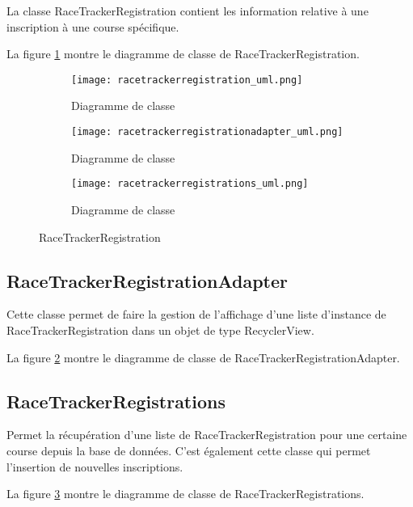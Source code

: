 La classe RaceTrackerRegistration contient les information relative à une inscription à une course spécifique.

La figure \ref{fig:racetrackerregistration_uml} montre le diagramme de classe de RaceTrackerRegistration.

\begin{figure}[htb!]
    \centering
    \begin{subfigure}[htb]{1\textwidth}
		\texttt{[image: racetrackerregistration\_uml.png]} 
		\caption{Diagramme de classe}
		\label{fig:racetrackerregistration_uml}
    \end{subfigure}
    \begin{subfigure}[htb]{1\textwidth}
		\texttt{[image: racetrackerregistrationadapter\_uml.png]} 
		\caption{Diagramme de classe}
		\label{fig:racetrackerregistrationadapter_uml}
    \end{subfigure}
    \begin{subfigure}[htb]{1\textwidth}
		\texttt{[image: racetrackerregistrations\_uml.png]} 
		\caption{Diagramme de classe}
		\label{fig:racetrackerregistrations_uml}
    \end{subfigure}
    \caption{RaceTrackerRegistration}\label{fig:racetrackerregistration_fig}
\end{figure}

\subsection{RaceTrackerRegistrationAdapter}

Cette classe permet de faire la gestion de l'affichage d'une liste d'instance de RaceTrackerRegistration dans un objet de type RecyclerView.

La figure \ref{fig:racetrackerregistrationadapter_uml} montre le diagramme de classe de RaceTrackerRegistrationAdapter.

\subsection{RaceTrackerRegistrations}

Permet la récupération d'une liste de RaceTrackerRegistration pour une certaine course depuis la base de données. C'est également cette classe qui permet l'insertion de nouvelles inscriptions.

La figure \ref{fig:racetrackerregistrations_uml} montre le diagramme de classe de RaceTrackerRegistrations.

